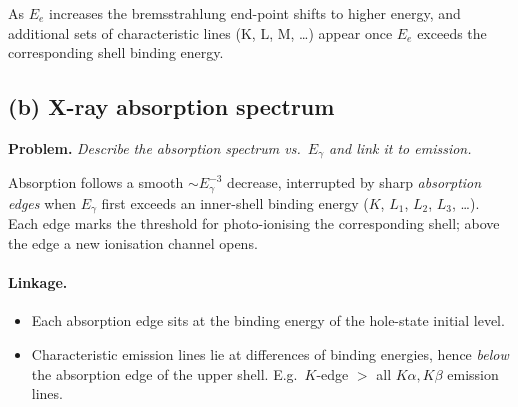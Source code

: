 \documentclass[11pt]{article}
\begin{document}
As $E_e$ increases the bremsstrahlung end-point shifts to higher energy, and additional sets of characteristic lines (K, L, M, \ldots) appear once $E_e$ exceeds the corresponding shell binding energy.

\subsection*{(b) X-ray absorption spectrum}

\textbf{Problem.} \emph{Describe the absorption spectrum vs.\ $E_\gamma$ and link it to emission.}

Absorption follows a smooth $\sim E_\gamma^{-3}$ decrease, interrupted by sharp \emph{absorption edges} when $E_\gamma$ first exceeds an inner-shell binding energy ($K$, $L_1$, $L_2$, $L_3$, \ldots). Each edge marks the threshold for photo-ionising the corresponding shell; above the edge a new ionisation channel opens.

\paragraph{Linkage.}
\begin{itemize}
\item Each absorption edge sits at the binding energy of the hole-state initial level.
\item Characteristic emission lines lie at differences of binding energies, hence \emph{below} the absorption edge of the upper shell. E.g.\ $K$-edge $> $ all $K\alpha,K\beta$ emission lines.
\end{itemize}

\begin{center}
\end{center}
\end{document}
